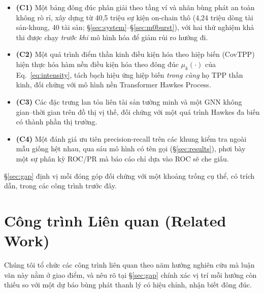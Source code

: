 \documentclass[11pt,a4paper]{article}
\begin{document}
\begin{itemize}[nosep]
    \item \textbf{(C1)} Một bảng đông đúc phân giải theo tầng ví và nhãn bùng phát an toàn không rò rỉ, xây dựng từ 40,5 triệu sự kiện on-chain thô (4,24 triệu dòng tài sản-khung, 40 tài sản; \S\ref{sec:system}--\S\ref{sec:m0burst}), với hai thử nghiệm khả thi được chạy \emph{trước khi} mô hình hóa để giảm rủi ro hướng đi.
    \item \textbf{(C2)} Một quá trình điểm thần kinh điều kiện hóa theo hiệp biến (CovTPP) hiện thực hóa hàm nền điều kiện hóa theo đông đúc $\mu_k(\cdot)$ của Eq.~\eqref{eq:intensity}, tách bạch hiệu ứng hiệp biến \emph{trong cùng} họ TPP thần kinh, đối chứng với mô hình nền Transformer Hawkes Process.
    \item \textbf{(C3)} Các đặc trưng lan tỏa liên tài sản tường minh và một GNN không gian--thời gian trên đồ thị vị thế, đối chứng với một quá trình Hawkes đa biến có thành phần thị trường.
    \item \textbf{(C4)} Một đánh giá ưu tiên precision-recall trên các khung kiểm tra ngoài mẫu giống hệt nhau, qua sáu mô hình có tên gọi (\S\ref{sec:results}), phơi bày một sự phân kỳ ROC/PR mà báo cáo chỉ dựa vào ROC sẽ che giấu.
\end{itemize}

\S\ref{sec:gap} định vị mỗi đóng góp đối chứng với một khoảng trống cụ thể, có trích dẫn, trong các công trình trước đây.

\section{Công trình Liên quan (Related Work)}
\label{sec:related}

Chúng tôi tổ chức các công trình liên quan theo năm hướng nghiên cứu mà luận văn này nằm ở giao điểm, và nêu rõ tại \S\ref{sec:gap} chính xác vị trí mỗi hướng còn thiếu so với một dự báo bùng phát thanh lý có hiệu chỉnh, nhận biết đông đúc.
\end{document}
